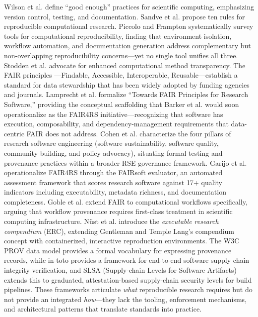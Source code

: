 \documentclass[
  english,
]{article}
\begin{document}
Wilson et al. \citep{wilson2017good} define ``good enough'' practices
for scientific computing, emphasizing version control, testing, and
documentation. Sandve et al. \citep{sandve2013ten} propose ten rules for
reproducible computational research. Piccolo and Frampton
\citep{piccolo2016tools} systematically survey tools for computational
reproducibility, finding that environment isolation, workflow
automation, and documentation generation address complementary but
non-overlapping reproducibility concerns---yet no single tool unifies
all three. Stodden et al. \citep{stodden2016enhancing} advocate for
enhanced computational method transparency. The FAIR principles
\citep{wilkinson2016fair}---Findable, Accessible, Interoperable,
Reusable---establish a standard for data stewardship that has been
widely adopted by funding agencies and journals. Lamprecht et al.
\citep{lamprecht2020towards} formalize ``Towards FAIR Principles for
Research Software,'' providing the conceptual scaffolding that Barker et
al. \citep{barker2022fair4rs} would soon operationalize as the FAIR4RS
initiative---recognizing that software has execution, composability, and
dependency-management requirements that data-centric FAIR does not
address. Cohen et al. \citep{cohen2021four} characterize the four
pillars of research software engineering (software sustainability,
software quality, community building, and policy advocacy), situating
formal testing and provenance practices within a broader RSE governance
framework. Garijo et al. \citep{garijo2024fairsoft} operationalize
FAIR4RS through the FAIRsoft evaluator, an automated assessment
framework that scores research software against 17+ quality indicators
including executability, metadata richness, and documentation
completeness. Goble et al. \citep{goble2020fair} extend FAIR to
computational workflows specifically, arguing that workflow provenance
requires first-class treatment in scientific computing infrastructure.
Nüst et al. \citep{nust2017containerization} introduce the
\emph{executable research compendium} (ERC), extending Gentleman and
Temple Lang's compendium concept with containerized, interactive
reproduction environments. The W3C PROV data model
\citep{moreau2013provdm} provides a formal vocabulary for expressing
provenance records, while in-toto \citep{torresarias2019intoto} provides
a framework for end-to-end software supply chain integrity verification,
and SLSA \citep{openssf2023slsa} (Supply-chain Levels for Software
Artifacts) extends this to graduated, attestation-based supply-chain
security levels for build pipelines. These frameworks articulate
\emph{what} reproducible research requires but do not provide an
integrated \emph{how}---they lack the tooling, enforcement mechanisms,
and architectural patterns that translate standards into practice.
\end{document}
